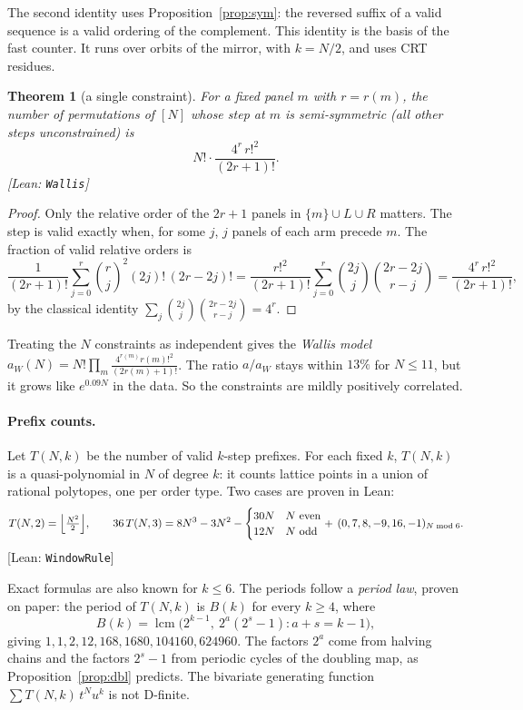 \documentclass[11pt]{article}
\newtheorem{theorem}{Theorem}
\theoremstyle{definition}
\theoremstyle{remark}
\newcommand{\lean}[1]{\textsf{\small[Lean: \texttt{#1}]}}
\begin{document}
The second identity uses Proposition~\ref{prop:sym}: the reversed suffix of a valid
sequence is a valid ordering of the complement. This identity is the basis of the
fast counter. It runs over orbits of the mirror, with $k=N/2$, and uses CRT residues.

\begin{theorem}[a single constraint]
For a fixed panel $m$ with $r=r(m)$, the number of permutations of $[N]$ whose step at
$m$ is semi-symmetric (all other steps unconstrained) is
\[
  N!\cdot\frac{4^r\, r!^2}{(2r+1)!}.
\]
\lean{Wallis}
\end{theorem}

\begin{proof}
Only the relative order of the $2r+1$ panels in $\{m\}\cup L\cup R$ matters. The step
is valid exactly when, for some $j$, $j$ panels of each arm precede $m$. The fraction
of valid relative orders is
\[
  \frac{1}{(2r+1)!}\sum_{j=0}^r \binom rj^2 (2j)!\,(2r-2j)!
  = \frac{r!^2}{(2r+1)!}\sum_{j=0}^r\binom{2j}{j}\binom{2r-2j}{r-j}
  = \frac{4^r\,r!^2}{(2r+1)!},
\]
by the classical identity $\sum_j\binom{2j}{j}\binom{2r-2j}{r-j}=4^r$.
\end{proof}

Treating the $N$ constraints as independent gives the \emph{Wallis model}
$a_W(N)=N!\prod_m \frac{4^{r(m)}r(m)!^2}{(2r(m)+1)!}$. The ratio $a/a_W$ stays
within $13\%$ for $N\le 11$, but it grows like $e^{0.09N}$ in the data. So the
constraints are mildly positively correlated.

\paragraph{Prefix counts.}
Let $T(N,k)$ be the number of valid $k$-step prefixes. For each fixed $k$, $T(N,k)$ is
a quasi-polynomial in $N$ of degree $k$: it counts lattice points in a union of
rational polytopes, one per order type. Two cases are proven in Lean:
\[
  T(N,2)=\Bigl\lfloor \tfrac{N^2}{2}\Bigr\rfloor,\qquad
  36\,T(N,3)= 8N^3-3N^2-\begin{cases}30N & N\text{ even}\\12N& N\text{ odd}\end{cases}
  +\,(0,7,8,-9,16,-1)_{N\bmod 6}.
\]
\lean{WindowRule}

Exact formulas are also known for $k\le6$. The periods follow a \emph{period law},
proven on paper: the period of $T(N,k)$ is $B(k)$ for every $k\ge 4$, where
\[
  B(k)=\operatorname{lcm}\bigl(2^{k-1},\ 2^{a}(2^{s}-1) : a+s=k-1\bigr),
\]
giving $1,1,2,12,168,1680,104160,624960$. The factors $2^a$ come from halving chains
and the factors $2^s-1$ from periodic cycles of the doubling map, as
Proposition~\ref{prop:dbl} predicts. The bivariate generating function
$\sum T(N,k)\,t^Nu^k$ is not D-finite.
\end{document}
